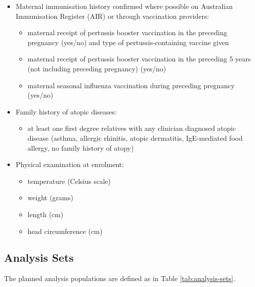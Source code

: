 \documentclass{bmcart}
\begin{document}
\begin{itemize}
\begin{itemize}
    \end{itemize}
    \item Maternal immunisation history confirmed where possible on Australian Immunisation Register (AIR) or through vaccination providers:
    \begin{itemize}
        \item maternal receipt of pertussis booster vaccination in the preceding pregnancy (yes/no) and type of pertussis-containing vaccine given
        \item maternal receipt of pertussis booster vaccination in the preceding 5 years (not including preceding pregnancy) (yes/no)
        \item maternal seasonal influenza vaccination during preceding pregnancy (yes/no)
    \end{itemize}
    \item Family history of atopic diseases:
    \begin{itemize}
  	    \item at least one first degree relatives with any clinician diagnosed atopic disease (asthma, allergic rhinitis, atopic dermatitis, IgE-mediated food allergy, no family history of atopy)
    \end{itemize}
	\item Physical examination at enrolment:
	\begin{itemize}
	    \item temperature (Celsius scale)
	    \item weight (grams)
	    \item length (cm)
	    \item head circumference (cm)
	\end{itemize}
\end{itemize}


\subsection*{Analysis Sets}

The planned analysis populations are defined as in Table \ref{tab:analysis-sets}.
\end{document}
